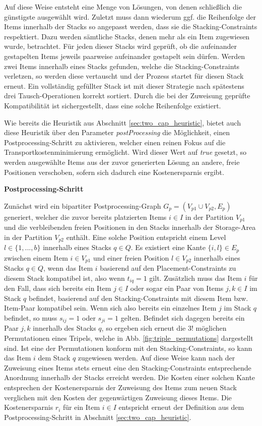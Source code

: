 Auf diese Weise entsteht eine Menge von Lösungen, von denen schließlich die günstigste ausgewählt wird.
Zuletzt muss dann wiederum ggf. die Reihenfolge der Items innerhalb der Stacks so angepasst werden,
dass sie die Stacking-Constraints respektiert. Dazu werden sämtliche Stacks, denen mehr als
ein Item zugewiesen wurde, betrachtet. Für jeden dieser Stacks wird geprüft, ob die aufeinander
gestapelten Items jeweils paarweise aufeinander gestapelt sein dürfen.
Werden zwei Items innerhalb eines Stacks gefunden, welche die Stacking-Constraints verletzen, so werden diese
vertauscht und der Prozess startet für diesen Stack erneut. Ein vollständig gefüllter Stack ist mit dieser
Strategie nach spätestens drei Tausch-Operationen korrekt sortiert. Durch die bei der Zuweisung geprüfte
Kompatibilität ist sichergestellt, dass eine solche Reihenfolge existiert.

Wie bereits die Heuristik aus Abschnitt \ref{sec:two_cap_heuristic}, bietet auch diese Heuristik über den Parameter
\textit{postProcessing} die Möglichkeit, einen Postprocessing-Schritt zu aktivieren, welcher einen reinen Fokus
auf die Transportkostenminimierung ermöglicht. Wird dieser Wert auf \textit{true} gesetzt, so werden ausgewählte Items aus der zuvor generierten Lösung an andere, freie Positionen verschoben, sofern sich dadurch eine Kostenersparnis ergibt.

\textbf{Postprocessing-Schritt}

Zunächst wird ein bipartiter Postprocessing-Graph $G_p = (V_{p1} \cup V_{p2}, E_p)$ generiert,
welcher die zuvor bereits platzierten Items $i \in I$ in der Partition $V_{p1}$ und die verbleibenden
freien Positionen in den Stacks innerhalb der Storage-Area in der Partition $V_{p2}$ enthält.
Eine solche Position entspricht einem Level $l \in \{1, ..., b\}$ innerhalb eines Stacks $q \in Q$.
Es existiert eine Kante $\{i, l\} \in E_p$ zwischen einem Item $i \in V_{p1}$ und einer freien
Position $l \in V_{p2}$ innerhalb eines Stacks $q \in Q$, wenn das Item $i$ basierend auf den Placement-Constraints
zu diesem Stack kompatibel ist, also wenn $t_{iq} = 1$ gilt.
Zusätzlich muss das Item $i$ für den Fall, dass sich bereits ein Item $j \in I$ oder sogar ein Paar von Items $j, k \in I$
im Stack $q$ befindet, basierend auf den Stacking-Constraints mit diesem Item bzw. Item-Paar kompatibel sein.
Wenn sich also bereits ein einzelnes Item $j$ im Stack $q$ befindet, so muss $s_{ij} = 1$ oder $s_{ji} = 1$ gelten.
Befindet sich dagegen bereits ein Paar $j, k$ innerhalb des Stacks $q$, so ergeben sich erneut die $3!$ möglichen Permutationen
eines Tripels, welche in Abb. \ref{fig:triple_permutations} dargestellt sind. Ist eine der Permutationen konform mit den Stacking-Constraints, so kann das Item $i$ dem Stack $q$ zugewiesen werden. Auf diese Weise kann nach der Zuweisung eines Items stets erneut eine den Stacking-Constraints entsprechende Anordnung innerhalb der Stacks erreicht werden.
Die Kosten einer solchen Kante entsprechen der Kostenersparnis der Zuweisung des Items zum neuen Stack verglichen mit den Kosten der gegenwärtigen Zuweisung dieses Items. Die Kostenersparnis $r_i$ für ein Item $i \in I$ entspricht erneut der Definition aus dem Postprocessing-Schritt in Abschnitt \ref{sec:two_cap_heuristic}.

